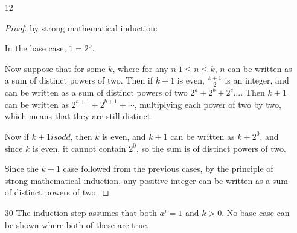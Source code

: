 \documentclass{article}
\begin{document}
\begin{enumerate}
\begin{enumerate}
\begin{proof}
          Since the $k+1$ case followed from the $k$, by the principle of
          mathematical induction, any number $n \geq 18$ can be formed from
          3- and 10-cent stamps.
        \end{proof}
      \item
        \begin{proof} by strong induction:

          For small amounts, the following amounts can be formed, represented
          as $a: (b,c)$, where $a$ is the amount of postage, and $b$ and $c$
          are the number of 3- and 10-cent stamps respectively: $0: (0,0),
          3: (1,0), 6: (2,0), 9: (3,0), 10: (0,1), 12: (4,0): 13: (1,1),
          15: (5,0), 16: (2,1)$.

          For amounts $n \geq 18$: In the base cases, $18: (6,0), 19: (3,1),
          20: (0,2)$.

          Now suppose that for some $k \geq 21$, all numbers $n | 18 \leq n
          < 21$ can be formed from three- and ten-cent stamps. \textit{
          (Inductive Hypothesis)} Since $k \geq 21$, then $k-3 \geq 18$, and
          so can be formed from three- and ten-cent stamps. Then $k$ can be
          formed from the combination making up $k-3$ plus one three-cent
          stamp.

          Since the $k$th case followed from the previous cases, by the
          principle of strong mathematical induction, any integer number
          of cents greater than or equal to 18 can be formed from three-
          and ten-cent stamps.
        \end{proof}
    \end{enumerate}
  \item[12]
    \begin{proof} by strong mathematical induction:
      
        In the base case, $1 = 2^0$.

        Now suppose that for some $k$, where for any $n | 1 \leq n \leq k$, $n$
        can be written as a sum of distinct powers of two. Then if $k+1$ is
        even, $\frac{k+1}{2}$ is an integer, and can be written as a sum of
        distinct powers of two $2^a + 2^b + 2^c\dots$. Then $k+1$ can be written
        as $2^{a+1} + 2^{b+1} + \cdots$, multiplying each power of two by two, 
        which means that they are still distinct.

        Now if $k+1 is odd$, then $k$ is even, and $k+1$ can be written as 
        $k + 2^0$, and since $k$ is even, it cannot contain $2^0$, so the sum
        is of distinct powers of two.

        Since the $k+1$ case followed from the previous cases, by the principle
        of strong mathematical induction, any positive integer can be written
        as a sum of distinct powers of two.
    \end{proof}
  \item[30]
    The induction step assumes that both $a^j = 1$ and $k > 0$. No base case
    can be shown where both of these are true.
\end{enumerate}
\end{document}
